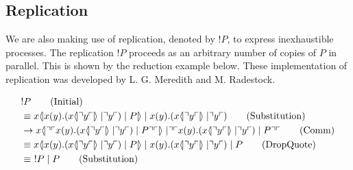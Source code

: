 \subsection{Replication}
We are also making use of replication, denoted by $!P$, to express inexhaustible processes.
The replication $!P$ proceeds as an arbitrary number of copies of $P$ in parallel. This is shown by the reduction example below. These implementation of replication was developed by L. G. Meredith and M. Radestock\citep{Meredith2005}.

\begin{align}
        &!P \tag{Initial} \\
        &\equiv \lift{x}{\inp{x}{y}(\lift{x}{\drop{y}}\para\drop{y})\para P}\para\inp{x}{y}(\lift{x}{\drop{y}}\para \drop{y}) \tag{Substitution} \\
        &\ra \lift{x}{\drop{\quot{\inp{x}{y}(\lift{x}{\drop{y}}\para\drop{y})\para P}}}\para\drop{\quot{\inp{x}{y}(\lift{x}{\drop{y}}\para\drop{y})\para P}} \tag{Comm}\\
        &\equiv \lift{x}{\inp{x}{y}(\lift{x}{\drop{y}}\para\drop{y})\para P}\para\inp{x}{y}(\lift{x}{\drop{y}}\para \drop{y})\para P \tag{DropQuote} \\
        &\equiv\ 
        !P\para P \tag{Substitution}
\end{align}

\FloatBarrier